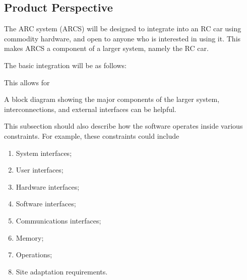 \documentclass[draftclsnofoot,onecolumn,10pt]{IEEEtran}
\begin{document}
\subsection{Product Perspective} %


The ARC system (ARCS) will be designed to integrate into an RC car using 
commodity hardware, and open to anyone who is interested in using it. This 
makes ARCS a component of a larger system, namely the RC car. \par
The basic integration will be as follows:

\vspace{10cm}

This allows for 

A block diagram showing the major components of the larger system,
interconnections, and external interfaces can be helpful.

This subsection should also describe how the software operates inside various
constraints. For example, these constraints could include
\begin{enumerate}
	\item System interfaces;
	\item User interfaces;
	\item Hardware interfaces;
	\item Software interfaces;
	\item Communications interfaces;
	\item Memory;
	\item Operations;
	\item Site adaptation requirements.
\end{enumerate}
\end{document}
